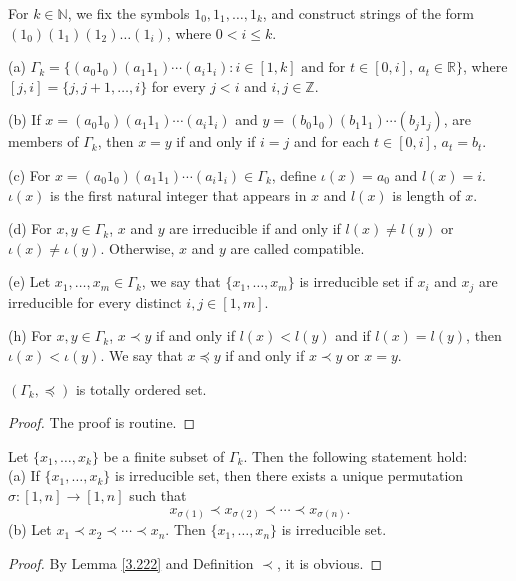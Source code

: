 \documentclass[twoside,11pt]{article}
\begin{document}
For \( k \in \mathbb{N} \), we fix the symbols \( 1_0, 1_1, \ldots, 1_k \), and construct strings of the form \( (1_0)( 1_{1})( 1_{2}) \ldots (1_{i}) \), where $0<i\leq k$. 
\begin{definition}
	
	(a) \( \Gamma_k = \{ (a_0 1_0)(a_1 1_1) \cdots (a_i 1_i) : i \in [1, k] \text{ and for } t \in [0,i],\ a_t \in \mathbb{R} \} \), where $[j,i]=\{j,j+1,\ldots,i\}$ for every $j<i$ and $i,j\in\mathbb{Z}$.
	
	(b) If \( x = (a_0 1_0)(a_1 1_1) \cdots (a_i 1_i) \) and \( y = (b_0 1_0)(b_1 1_1) \cdots (b_j 1_j) \), are members of \( \Gamma_k \), then 
	$
	x = y $ if and only if $i = j$ and for each  $t \in [0, i]$, $a_t = b_t$.
	
	(c) For \( x = (a_0 1_0)(a_1 1_1) \cdots (a_i 1_i) \in \Gamma_k \), define \( \iota(x) = a_0 \) and \( l(x) = i \). $\iota(x)$ is the first natural integer that appears in $x$ and $l(x)$ is length of $x$.
	
	(d) For \( x, y \in \Gamma_k \), $ x $ and $y$ are irreducible if and only if  $l(x)\neq l(y)$  or \( \iota(x)\neq\iota(y) \). Otherwise, $x$ and $y$ are called compatible. 
	
	(e) Let $x_1,\ldots,x_m\in \Gamma_k$, we say that $\{x_1,\ldots,x_m\}$ is irreducible set if $x_i$ and $x_j$ are irreducible for every distinct $i,j\in[1,m]$. 
	
	(h) For \( x, y \in \Gamma_k \), \( x \prec y \) if and only if \( l(x) < l(y) \) and if \( l(x)=l(y) \), then \( \iota(x) < \iota(y) \). We say that $x\preceq y$ if and only if $x\prec y$ or $x=y$.
\end{definition} 
\begin{lemma}{\label{3.222}}
	$(\Gamma_k,\preceq)$ is totally ordered set.
\end{lemma}
\begin{proof}
	The proof is routine.	
\end{proof}
\begin{lemma}{\label{{3.33}}}
	Let $\{x_1,\ldots,x_k\}$ be a finite subset of $\Gamma_k$. Then the following statement hold: \\
	(a) If $\{x_1,\ldots,x_k\}$ is irreducible set, then there exists a unique permutation $\sigma:[1,n]\to[1,n]$ such that 
	\[
	x_{\sigma(1)}\prec x_{\sigma(2)}\prec\cdots\prec x_{\sigma(n)}.
	\]
	(b) Let $	x_{1}\prec x_{2}\prec\cdots\prec x_{n}$. Then $\{x_1,\ldots,x_n\}$ is irreducible set.
\end{lemma}
\begin{proof}
	By Lemma \ref{3.222} and Definition $\prec$, it is obvious.
\end{proof}
\end{document}
